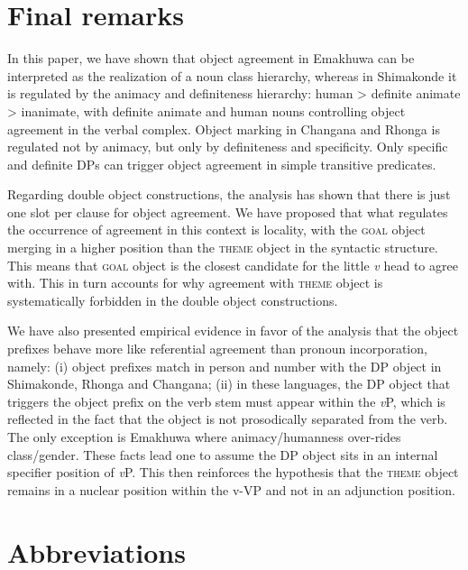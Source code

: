 \documentclass[output=paper]{langsci/langscibook}
\begin{document}
\section{Final remarks}

In this paper, we have shown that object agreement in Emakhuwa can be interpreted as the realization of a noun class hierarchy, whereas in Shimakonde it is regulated by the animacy and definiteness hierarchy: human > definite animate > inanimate, with definite animate and human nouns controlling object agreement in the verbal complex. Object marking in Changana and Rhonga is regulated not by animacy, but only by definiteness and specificity. Only specific and definite DPs can trigger object agreement in simple transitive predicates.

Regarding double object constructions, the analysis has shown that there is just one slot per clause for object agreement. We have proposed that what regulates the occurrence of agreement in this context is locality, with the \textsc{goal} object merging in a higher position than the \textsc{theme} object in the syntactic structure. This means that \textsc{goal} object is the closest candidate for the little {\textit{v}} head to agree with. This in turn accounts for why agreement with \textsc{theme} object is systematically forbidden in the double object constructions. 

We have also presented empirical evidence in favor of the analysis that the object prefixes behave more like referential agreement than pronoun incorporation, namely: (i) object prefixes match in person and number with the DP object in Shimakonde, Rhonga and Changana; (ii) in these languages, the DP object that triggers the object prefix on the verb stem must appear within the \textit{v}P, which is reflected in the fact that the object is not prosodically separated from the verb. The only exception is Emakhuwa where animacy/humanness over-rides class/gender. These facts lead one to assume the DP object sits in an internal specifier position of \textit{v}P. This then reinforces the hypothesis that the \textsc{theme} object remains in a nuclear position within the v-VP and not in an adjunction position.

\section {Abbreviations}
\end{document}

